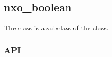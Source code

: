 %
%
%
%
%

\subsection{nxo\_boolean}
\label{nxo_boolean}

The  class is a subclass of the  class.

\subsubsection{API}
